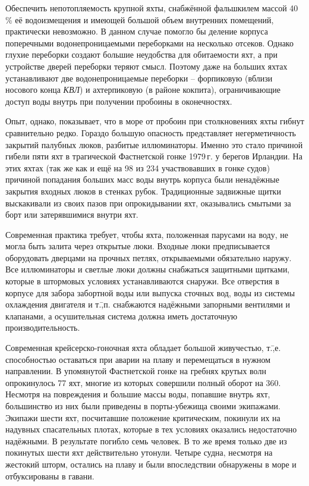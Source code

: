 Обеспечить непотопляемость крупной яхты, снабжённой фальшкилем массой
40\,\% её водоизмещения и имеющей большой объем внутренних
помещений, практически невозможно. В данном случае помогло бы деление
корпуса поперечными водонепроницаемыми переборками на несколько
отсеков. Однако глухие переборки создают большие неудобства для
обитаемости яхт, а при устройстве дверей переборки теряют
смысл. Поэтому даже на больших яхтах устанавливают две
водонепроницаемые переборки \--- форпиковую (вблизи носового конца
\textit{КВЛ}) и ахтерпиковую (в районе кокпита), ограничивающие доступ
воды внутрь при получении пробоины в оконечностях.

Опыт, однако, показывает, что в море от пробоин при столкновениях яхты
гибнут сравнительно редко. Гораздо большую опасность представляет
негерметичность закрытий палубных люков, разбитые иллюминаторы. Именно
это стало причиной гибели пяти яхт в трагической Фастнетской гонке
1979\,г. у берегов Ирландии. На этих яхтах (так же как и ещё на 98 из
234 участвовавших в гонке судов) причиной попадания больших масс воды
внутрь корпуса были ненадёжные закрытия входных люков в стенках
рубок. Традиционные задвижные щитки выскакивали из своих пазов при
опрокидывании яхт, оказывались смытыми за борт или затерявшимися
внутри яхт.

Современная практика требует, чтобы яхта, положенная парусами на воду,
не могла быть залита через открытые люки. Входные люки предписывается
оборудовать дверцами на прочных петлях, открываемыми обязательно
наружу. Все иллюминаторы и светлые люки должны снабжаться защитными
щитками, которые в штормовых условиях устанавливаются снаружи. Все
отверстия в корпусе для забора забортной воды или выпуска сточных вод,
воды из системы охлаждения двигателя и т.\=,п. снабжаются надёжными
запорными вентилями и клапанами, а осушительная система должна иметь
достаточную производительность.

Современная крейсерско-гоночная яхта обладает большой живучестью,
т.\=,е. способностью оставаться при аварии на плаву и перемещаться в
нужном направлении. В упомянутой Фастнетской гонке на гребнях крутых
волн опрокинулось 77 яхт, многие из которых совершили полный оборот на
360\gr. Несмотря на повреждения и большие массы воды, попавшие внутрь
яхт, большинство из них были приведены в порты-убежища своими
экипажами. Экипажи шести яхт, посчитавшие положение критическим,
покинули их на надувных спасательных плотах, которые в тех условиях
оказались недостаточно надёжными. В результате погибло семь человек. В
то же время только две из покинутых шести яхт действительно
утонули. Четыре судна, несмотря на жестокий шторм, остались на плаву и
были впоследствии обнаружены в море и отбуксированы в гавани.

